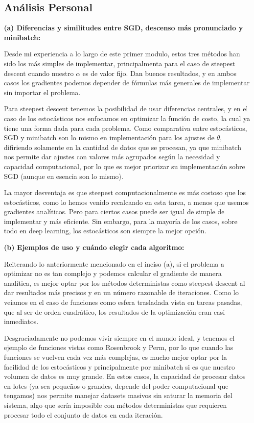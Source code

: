 \documentclass{article}
\begin{document}
\subsection{Análisis Personal}

\textbf{(a) Diferencias y similitudes entre SGD, descenso más pronunciado y minibatch:}

Desde mi experiencia a lo largo de este primer modulo, estos tres métodos han sido los más simples de implementar, principalmenta para el caso de steepest descent cuando nuestro $\alpha$ es de valor fijo. Dan buenos resultados, y en ambos casos los gradientes podemos depender de fórmulas más generales de implementar sin importar el problema.

Para steepest descent tenemos la posibilidad de usar diferencias centrales, y en el caso de los estocásticos nos enfocamos en optimizar la función de costo, la cual ya tiene una forma dada para cada problema. Como comparativa entre estocásticos, SGD y minibatch son lo mismo en implementación para los ajustes de $\theta$, difiriendo solamente en la cantidad de datos que se procesan, ya que minibatch nos permite dar ajustes con valores más agrupados según la necesidad y capacidad computacional, por lo que es mejor priorizar su implementación sobre SGD (aunque en esencia son lo mismo).

La mayor desventaja es que steepest computacionalmente es más costoso que los estocásticos, como lo hemos venido recalcando en esta tarea, a menos que usemos gradientes analíticos. Pero para ciertos casos puede ser igual de simple de implementar y más eficiente. Sin embargo, para la mayoría de los casos, sobre todo en deep learning, los estocásticos son siempre la mejor opción.

\textbf{(b) Ejemplos de uso y cuándo elegir cada algoritmo:}

Reiterando lo anteriormente mencionado en el inciso (a), si el problema a optimizar no es tan complejo y podemos calcular el gradiente de manera analítica, es mejor optar por los métodos deterministas como steepest descent al dar resultados más precisos y en un número razonable de iteraciones. Como lo veíamos en el caso de funciones como esfera trasladada vista en tareas pasadas, que al ser de orden cuadrático, los resultados de la optimización eran casi inmediatos.

Desgraciadamente no podemos vivir siempre en el mundo ideal, y tenemos el ejemplo de funciones vistas como Rosenbrook y Perm, por lo que cuando las funciones se vuelven cada vez más complejas, es mucho mejor optar por la facilidad de los estocásticos y principalmente por minibatch si es que nuestro volumen de datos es muy grande. En estos casos, la capacidad de procesar datos en lotes (ya sea pequeños o grandes, depende del poder computacional que tengamos) nos permite manejar datasets masivos sin saturar la memoria del sistema, algo que sería imposible con métodos deterministas que requieren procesar todo el conjunto de datos en cada iteración.
\end{document}
